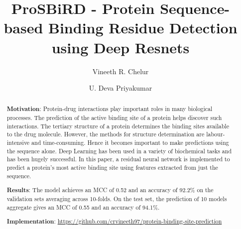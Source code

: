 \documentclass[journal=jacsat,manuscript=article]{achemso}
\author{Vineeth R. Chelur}
\author{U. Deva Priyakumar}
\affiliation[IIIT-H]
{Center for Computational Natural Sciences \& Bioinformatics, IIIT-H, Hyderabad}
\title[ProSBiRD - Protein Sequence-based Binding Residue Detection using Deep Resnets]
  {ProSBiRD - Protein Sequence-based Binding Residue Detection using Deep Resnets
  }
\begin{document}






\begin{abstract}
    \noindent\textbf{Motivation}: Protein-drug interactions play important roles in many biological processes. The prediction of the active binding site of a protein helps discover such interactions. The tertiary structure of a protein determines the binding sites available to the drug molecule. However, the methods for structure determination are labour-intensive and time-consuming. Hence it becomes important to make predictions using the sequence alone. Deep Learning has been used in a variety of biochemical tasks and has been hugely successful. In this paper, a residual neural network is implemented to predict a protein's most active binding site using features extracted from just the sequence.

    \noindent\textbf{Results}: The model achieves an MCC of 0.52 and an accuracy of 92.2\% on the validation sets averaging across 10-folds. On the test set, the prediction of 10 models aggregate gives an MCC of 0.55 and an accuracy of 94.1\%.

    \noindent\textbf{Implementation}: \href{https://github.com/crvineeth97/protein-binding-site-prediction}{https://github.com/crvineeth97/protein-binding-site-prediction}
\end{abstract}
\end{document}
